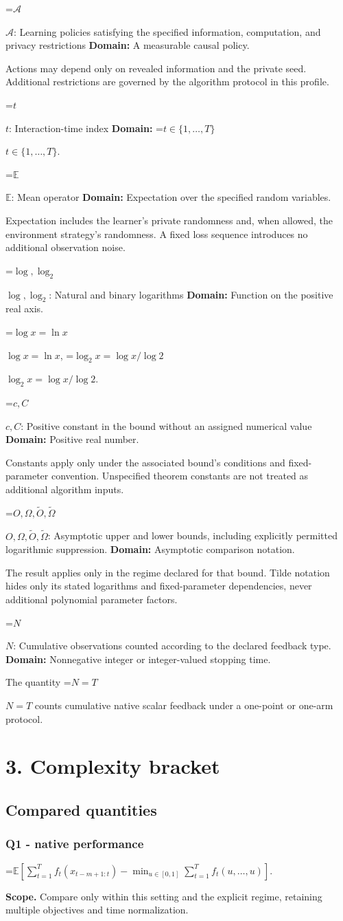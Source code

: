 \documentclass[10pt,a4paper]{article}
\newcommand{\AtlasMath}[1]{\par\begingroup\centering\setbox0=\hbox{$\displaystyle #1$}\ifdim\wd0>1.4\linewidth\typeout{ATLAS WIDE FORMULA: \the\wd0}\fi\ifdim\wd0>\linewidth\resizebox{\linewidth}{!}{\box0}\else\box0\fi\par\endgroup}
\newcommand{\AtlasInlineMath}[1]{\begingroup\setbox0=\hbox{$#1$}\ifdim\wd0>.4\linewidth\endgroup\AtlasMath{#1}\else\endgroup$#1$\fi}
\begin{document}
\AtlasInlineMath{\mathcal A}: Learning policies satisfying the specified information, computation, and privacy restrictions \textbf{Domain:} A measurable causal policy.

Actions may depend only on revealed information and the private seed. Additional restrictions are governed by the algorithm protocol in this profile.

\AtlasInlineMath{t}: Interaction-time index \textbf{Domain:} \AtlasInlineMath{t\in\{1,\ldots,T\}}.

\AtlasInlineMath{\mathbb E}: Mean operator \textbf{Domain:} Expectation over the specified random variables.

Expectation includes the learner's private randomness and, when allowed, the environment strategy's randomness. A fixed loss sequence introduces no additional observation noise.

\AtlasInlineMath{\log,\log_2}: Natural and binary logarithms \textbf{Domain:} Function on the positive real axis.

\AtlasInlineMath{\log x=\ln x}, \AtlasInlineMath{\log_2x=\log x/\log2}.

\AtlasInlineMath{c,C}: Positive constant in the bound without an assigned numerical value \textbf{Domain:} Positive real number.

Constants apply only under the associated bound’s conditions and fixed-parameter convention. Unspecified theorem constants are not treated as additional algorithm inputs.

\AtlasInlineMath{O,\Omega,\widetilde O,\widetilde\Omega}: Asymptotic upper and lower bounds, including explicitly permitted logarithmic suppression. \textbf{Domain:} Asymptotic comparison notation.

The result applies only in the regime declared for that bound. Tilde notation hides only its stated logarithms and fixed-parameter dependencies, never additional polynomial parameter factors.

\AtlasInlineMath{N}: Cumulative observations counted according to the declared feedback type. \textbf{Domain:} Nonnegative integer or integer-valued stopping time.

The quantity \AtlasInlineMath{N=T} counts cumulative native scalar feedback under a one-point or one-arm protocol.

\section{3. Complexity bracket}
\subsection{Compared quantities}
\subsubsection{Q1 - native performance}
\AtlasMath{\mathbb E\!\left[\sum_{t=1}^{T}f_t(x_{t-m+1:t})-\min_{u\in[0,1]}\sum_{t=1}^{T}f_t(u,\ldots,u)\right].}
\textbf{Scope.} Compare only within this setting and the explicit regime, retaining multiple objectives and time normalization.
\end{document}
